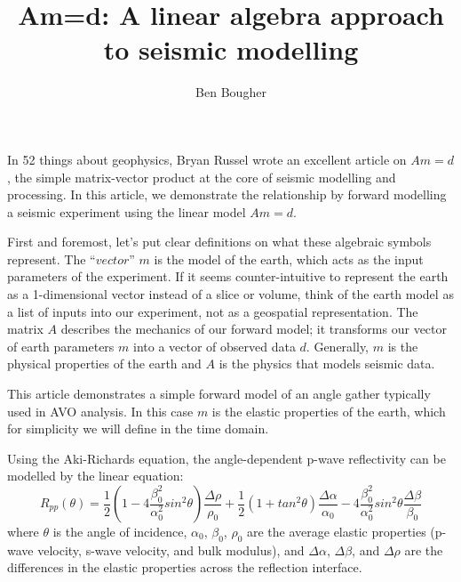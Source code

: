 \documentclass{article} %
\title{Am=d: A linear algebra approach to seismic modelling}
\author{Ben Bougher}
\begin{document}
\maketitle

In 52 things about geophysics, Bryan Russel wrote an excellent article
on $Am=d$, the simple matrix-vector product at the core of seismic 
modelling and processing. In this article, we demonstrate the relationship 
by forward modelling a seismic experiment using the linear model $Am=d$.

First and foremost, let's put clear definitions on what these
algebraic symbols represent. The ``$vector$'' $m$ is the model of the earth,
which acts as the input parameters of the experiment. If it seems counter-intuitive 
to represent the earth as a 1-dimensional vector instead of a slice or volume, think of
the earth model as a list of inputs into our experiment, not as a geospatial
representation. The matrix $A$ describes the mechanics of our 
forward model; it transforms our vector of earth parameters $m$
into a vector of observed data $d$. Generally, $m$ is the physical 
properties of the earth and $A$ is the physics that models seismic data.

This article demonstrates a simple forward model of an angle gather typically 
used in AVO analysis. In this case $m$ is the elastic properties of the earth,
which for simplicity we will define in the time domain.

Using the Aki-Richards equation, the angle-dependent p-wave reflectivity
can be modelled by the linear equation:
\begin{equation}\label{eq:1}
R_{pp}(\theta)=\frac{1}{2}(1-4\frac{\beta_0^2}{\alpha_0^2}sin^2\theta)\frac{\Delta\rho}
{\rho_0}+ \frac{1}{2}(1+tan^2\theta)\frac{\Delta\alpha}{\alpha_0} -
4\frac{\beta_0^2}
{\alpha_0^2}sin^2\theta\frac{\Delta\beta}{\beta_0}
\end{equation}
where $\theta$ is the angle of incidence, $\alpha_0$, $\beta_0$,
$\rho_0$ are the average elastic properties (p-wave velocity, s-wave velocity, and bulk
modulus), and $\Delta\alpha$, $\Delta\beta$, and $\Delta\rho$ are the
differences in the elastic properties across the reflection interface.
\end{document}
